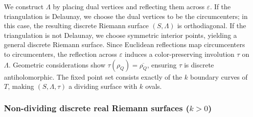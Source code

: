 \documentclass[11pt,a4paper]{article}
\theoremstyle{definition}
\begin{document}
We construct $\Lambda$ by placing dual vertices and reflecting them across $\varepsilon$. If the triangulation is Delaunay, we choose the dual vertices to be the circumcenters; in this case, the resulting discrete Riemann surface $(S, \Lambda)$ is orthodiagonal. If the triangulation is not Delaunay, we choose symmetric interior points, yielding a general discrete Riemann surface.
Since Euclidean reflections map circumcenters to circumcenters, the reflection across $\varepsilon$ induces a color-preserving involution $\tau$ on $\Lambda$. Geometric considerations show $\tau(\rho_Q) = \overline{\rho_Q}$, ensuring $\tau$ is discrete antiholomorphic. The fixed point set consists exactly of the $k$ boundary curves of $T$, making $(S, \Lambda, \tau)$ a dividing surface with $k$ ovals.

\subsubsection*{Non-dividing discrete real Riemann surfaces ($k > 0$)}
\end{document}
